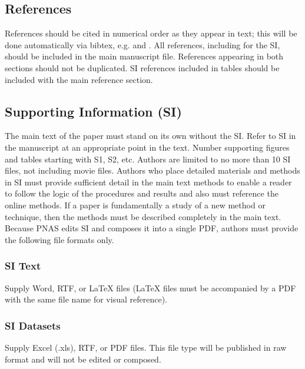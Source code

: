 \documentclass[9pt,twocolumn,twoside,lineno]{pnas-new}
\begin{document}
\subsection*{References}

References should be cited in numerical order as they appear in text; this will be done automatically via bibtex, e.g. \cite{belkin2002using} and \cite{berard1994embedding,coifman2005geometric}. All references, including for the SI, should be included in the main manuscript file. References appearing in both sections should not be duplicated.  SI references included in tables should be included with the main reference section. 


\subsection*{Supporting Information (SI)}

The main text of the paper must stand on its own without the SI. Refer to SI in the manuscript at an appropriate point in the text. Number supporting figures and tables starting with S1, S2, etc. Authors are limited to no more than 10 SI files, not including movie files. Authors who place detailed materials and methods in SI must provide sufficient detail in the main text methods to enable a reader to follow the logic of the procedures and results and also must reference the online methods. If a paper is fundamentally a study of a new method or technique, then the methods must be described completely in the main text. Because PNAS edits SI and composes it into a single PDF, authors must provide the following file formats only.

\subsubsection*{SI Text}

Supply Word, RTF, or LaTeX files (LaTeX files must be accompanied by a PDF with the same file name for visual reference).



\subsubsection*{SI Datasets} 

Supply Excel (.xls), RTF, or PDF files. This file type will be published in raw format and will not be edited or composed. 



\end{document}
